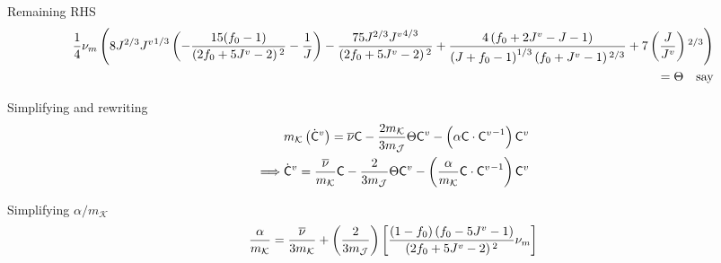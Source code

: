 \documentclass{beamer}
\def\myC{{\bf\mathsf{C}}}
\newcommand\lrB[1]{{\left[#1 \right]}}
\begin{document}
    \begin{frame}
        \begin{block}{\footnotesize Remaining RHS}
            \tiny\begin{align*}
                \frac{1}{4} \nu _m 
                \left(8 J^{2/3} {J^v}^{1/3} 
                    \left(-\frac{15 (f_0-1)}{\left(2 f_0+5 {J^v}-2\right){}^2}-\frac{1}{J}\right)
                -\frac{75 J^{2/3} {J^v}^{4/3}}{\left(2 f_0+5 {J^v}-2\right){}^2}
                +\frac{4 \left(f_0+2 {J^v}-J-1\right)}{{\left(J + f_0 - 1\right)}^{1/3} \left(f_0+{J^v}-1\right){}^{2/3}}+7 \left(\frac{J}{{J^v}}\right){}^{2/3}\right)\\ = \Theta\quad\text{say}
            \end{align*}
        \end{block}
        \begin{block}{\footnotesize Simplifying and rewriting}
            \footnotesize\begin{align*}
                &m_\mathcal{K}\lr{\dot{\myC}^v}
                =\overline{\nu}\myC - \frac{2m_\mathcal{K}}{3m_\mathcal{J}}\Theta\myC^v
                -
                \lr{\alpha\myC\cdot{\myC^v}^{-1}}\myC^v\\
                \implies &
                {\dot{\myC}^v} = \frac{\overline{\nu}}{m_\mathcal{K}}\myC
                -
                \frac{2}{3m_\mathcal{J}}\Theta\myC^v-
                \lr{
                    \frac{\alpha}{m_\mathcal{K}}\myC\cdot{\myC^v}^{-1}
                }\myC^v
            \end{align*}
        \end{block}
        \begin{block}{\footnotesize Simplifying $\alpha/m_\mathcal{K}$}
            \footnotesize\begin{align*}
                \frac{\alpha}{m_\mathcal{K}}=\frac{\overline{\nu}}{3m_\mathcal{K}}
                +
                \lr{\frac{2}{3m_\mathcal{J}}} \lrB{
                    \frac{\lr{1-f_0}\left(f_0-5 J^v-1\right)}{\left(2 f_0+5 J^v-2\right){}^2}
                    \nu _m }
            \end{align*}
        \end{block}
    \end{frame}
\end{document}
